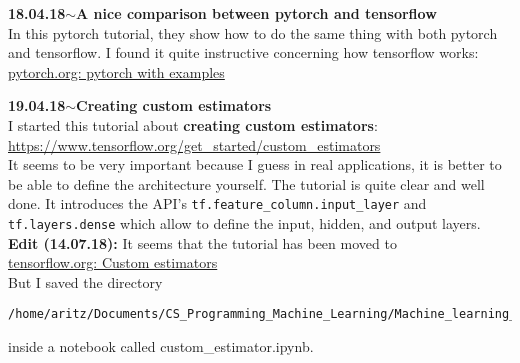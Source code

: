 \documentclass[11pt,a4paper]{article}
\newenvironment{loggentry}[2]%
{\noindent\textbf{#1}\hspace{1cm}$\mathbf{\sim}$\text{ }\textbf{#2}\\}{\vspace{0.5cm}}
\begin{document}
\begin{loggentry}{18.04.18}{A nice comparison between pytorch and tensorflow}
In this pytorch tutorial, they show how to do the same thing with both pytorch and tensorflow. I found it quite instructive concerning how tensorflow works:\\
\href{http://pytorch.org/tutorials/beginner/pytorch_with_examples.html#pytorch-variables-and-autograd}{pytorch.org: pytorch with examples}
\end{loggentry}

\begin{loggentry}{19.04.18}{Creating custom estimators}
I started this tutorial about \textbf{creating custom estimators}:\\
\url{https://www.tensorflow.org/get_started/custom_estimators}\\
It seems to be very important because I guess in real applications, it is better to be able to define the architecture yourself. The tutorial is quite clear and well done. It introduces the API's \texttt{tf.feature\_column.input\_layer} and \texttt{tf.layers.dense} which allow to define the input, hidden, and output layers.\\
\textbf{Edit (14.07.18):} It seems that the tutorial has been moved to\\
\href{https://www.tensorflow.org/guide/custom_estimators}{tensorflow.org: Custom estimators}\\
But I saved the directory
\begin{verbatim}
/home/aritz/Documents/CS_Programming_Machine_Learning/Machine_learning_and_AI/Online_courses/Tensor_flow_tutorials/Official_tutorials/
\end{verbatim}
inside a notebook called custom\_estimator.ipynb.
\end{loggentry}
\end{document}
